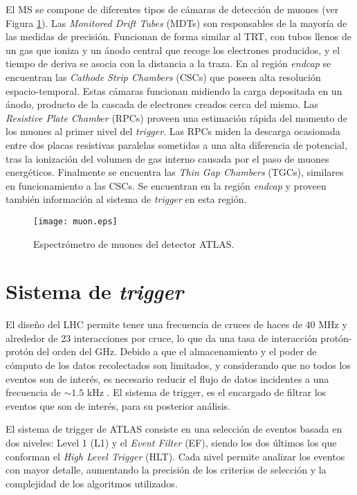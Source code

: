 El MS se compone de diferentes tipos de cámaras de detección de muones (ver Figura \ref{muon}). Las \textit{Monitored Drift Tubes} (MDTs) son responsables de la mayoría de las medidas de precisión. Funcionan de forma similar al TRT, con tubos llenos de un gas que ioniza y un ánodo central que recoge los electrones producidos, y el tiempo de deriva se asocia con la distancia a la traza. En al región \textit{endcap} se encuentran las \textit{Cathode Strip Chambers} (CSCs) que poseen alta resolución espacio-temporal. Estas cámaras funcionan midiendo la carga depositada en un ánodo, producto de la cascada de electrones creados cerca del mismo. Las \textit{Resistive Plate Chamber} (RPCs) proveen una estimación rápida del momento de los muones al primer nivel del \textit{trigger}. Las RPCs miden la descarga ocasionada entre dos placas resistivas paralelas sometidas a una alta diferencia de potencial, tras la ionización del volumen de gas interno causada por el paso de muones energéticos. Finalmente se encuentra las \textit{Thin Gap Chambers} (TGCs), similares en funcionamiento a las CSCs. Se encuentran en la región \textit{endcap} y proveen también información al sistema de \textit{trigger} en esta región.


\begin{figure}
\centering
\texttt{[image: muon.eps]}
\caption{Espectrómetro de muones del detector ATLAS.}
\label{muon}
\end{figure}



\section{Sistema de \textit{trigger}}

El diseño del LHC permite tener una frecuencia de cruces de haces de 40 MHz y alrededor de 23 interacciones por cruce, lo que da una tasa de interacción protón-protón del orden del GHz. Debido a que el almacenamiento y el poder de cómputo de los datos recolectados son limitados, y considerando que no todos los eventos son de interés, es necesario reducir el flujo de datos incidentes a una frecuencia de $\sim 1.5$ kHz \cite{PERF-2011-02}. El sistema de trigger, es el encargado de filtrar los eventos que son de interés, para su posterior análisis. 

El sistema de trigger de ATLAS consiste en una selección de eventos basada en dos niveles: Level 1 (L1) y el \textit{Event Filter} (EF), siendo los dos últimos los que conforman el \textit{High Level Trigger} (HLT). Cada nivel permite analizar los eventos con mayor detalle, aumentando la precisión de los criterios de selección y la complejidad de los algoritmos utilizados.

